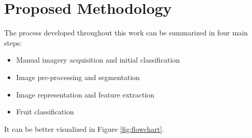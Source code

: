 \documentclass[../main.tex]{subfile}
\begin{document}
\section{Proposed Methodology} \label{sec:proposed-methodology}

    

    The process developed throughout this work can be summarized in four main steps:
    \begin{itemize}
        \item Manual imagery acquisition and initial classification
        \item Image pre-processing and segmentation
        \item Image representation and feature extraction 
        \item Fruit classification
    \end{itemize}
    It can be better visualized in Figure \ref{fig:flowchart}.
\end{document}
